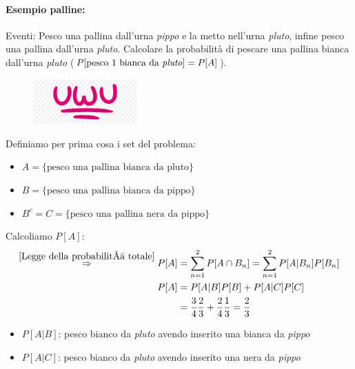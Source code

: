             \paragraph{Esempio palline:}
                Eventi: Pesco una pallina dall'urna \emph{pippo} e la metto nell'urna \emph{pluto}, infine pesco una pallina dall'urna \emph{pluto}.
                Calcolare la probabilità di pescare una pallina bianca dall'urna \emph{pluto} ($P[\text{pesco 1 bianca da \emph{pluto}}] = P[A]$).  
                \begin{figure}[H]
                    \centering
                    \includegraphics[width = 4cm]{media/uwu.png}
                \end{figure}
                Definiamo per prima cosa i set del problema:
                \begin{itemize}
                    \item {$A = \{ \text{pesco una pallina bianca da pluto}\}$}
                    \item {$B = \{ \text{pesco una pallina bianca da pippo}\}$}
                    \item {$B^c = C = \{ \text{pesco una pallina nera da pippo}\}$}
                \end{itemize}
                Calcoliamo $P[A]$:
                \begin{align}
                    \overset{\ref{Legge della probabilità totale}}{\Rightarrow} P[A] &= \sum_{n=1}^{2} P[A\cap B_n] = \sum_{n=1}^{2} P[A|B_n] P[B_n] \nonumber \\
                    P[A] &= P[A|B]P[B] + P[A|C]P[C] \nonumber \\
                         &= \frac{3}{4}\frac{2}{3} + \frac{2}{4}\frac{1}{3} = \frac{2}{3}  \nonumber       
                \end{align}
                \begin{itemize}
                    \item {$P[A|B]$: pesco bianco da \emph{pluto} avendo inserito una bianca da \emph{pippo}}
                    \item {$P[A|C]$: pesco bianco da \emph{pluto} avendo inserito una nera da \emph{pippo}}
                \end{itemize}

